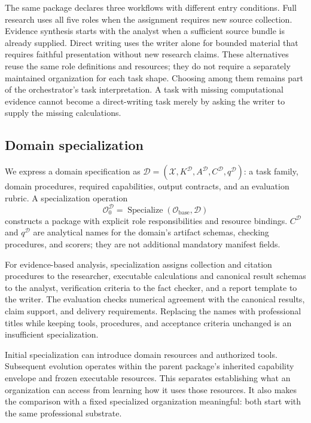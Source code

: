 The same package declares three workflows with different entry conditions. Full research uses all five roles when the assignment requires new source collection. Evidence synthesis starts with the analyst when a sufficient source bundle is already supplied. Direct writing uses the writer alone for bounded material that requires faithful presentation without new research claims. These alternatives reuse the same role definitions and resources; they do not require a separately maintained organization for each task shape. Choosing among them remains part of the orchestrator's task interpretation. A task with missing computational evidence cannot become a direct-writing task merely by asking the writer to supply the missing calculations.



\subsection{Domain specialization}
We express a domain specification as $\mathcal D=(\mathcal X,K^{\mathcal D},A^{\mathcal D},C^{\mathcal D},q^{\mathcal D})$: a task family, domain procedures, required capabilities, output contracts, and an evaluation rubric. A specialization operation
\begin{equation}
\mathcal O^{\mathcal D}_0
  =\operatorname{Specialize}(\mathcal O_{\mathrm{base}},\mathcal D)
\label{eq:specialization}
\end{equation}
constructs a package with explicit role responsibilities and resource bindings. $C^{\mathcal D}$ and $q^{\mathcal D}$ are analytical names for the domain's artifact schemas, checking procedures, and scorers; they are not additional mandatory manifest fields.

For evidence-based analysis, specialization assigns collection and citation procedures to the researcher, executable calculations and canonical result schemas to the analyst, verification criteria to the fact checker, and a report template to the writer. The evaluation checks numerical agreement with the canonical results, claim support, and delivery requirements. Replacing the names with professional titles while keeping tools, procedures, and acceptance criteria unchanged is an insufficient specialization.

Initial specialization can introduce domain resources and authorized tools. Subsequent evolution operates within the parent package's inherited capability envelope and frozen executable resources. This separates establishing what an organization can access from learning how it uses those resources. It also makes the comparison with a fixed specialized organization meaningful: both start with the same professional substrate.



